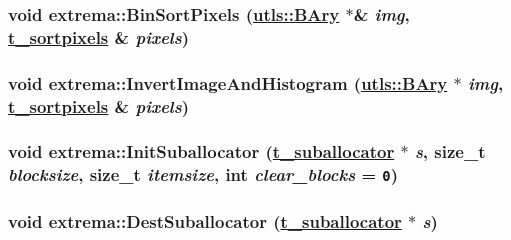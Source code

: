 \hypertarget{namespaceextrema_85efee4f382151dffcde01fae9e024a2}{
\subsubsection[BinSortPixels]{\setlength{\rightskip}{0pt plus 5cm}void extrema::Bin\-Sort\-Pixels (\hyperlink{structutls_1_1Ary}{utls::BAry} $\ast$\& {\em img}, \hyperlink{namespaceextrema_fe82307c3b119c3da09a001341fa3560}{t\_\-sortpixels} \& {\em pixels})}}
\label{namespaceextrema_85efee4f382151dffcde01fae9e024a2}


\hypertarget{namespaceextrema_15d6b1b2157ca27ca1aa21c4508ee33f}{
\subsubsection[InvertImageAndHistogram]{\setlength{\rightskip}{0pt plus 5cm}void extrema::Invert\-Image\-And\-Histogram (\hyperlink{structutls_1_1Ary}{utls::BAry} $\ast$ {\em img}, \hyperlink{namespaceextrema_fe82307c3b119c3da09a001341fa3560}{t\_\-sortpixels} \& {\em pixels})}}
\label{namespaceextrema_15d6b1b2157ca27ca1aa21c4508ee33f}


\hypertarget{namespaceextrema_0b971925373c3684db10539689b21879}{
\subsubsection[InitSuballocator]{\setlength{\rightskip}{0pt plus 5cm}void extrema::Init\-Suballocator (\hyperlink{namespaceextrema_6be19e858e73efb5002c6ee94bba43fb}{t\_\-suballocator} $\ast$ {\em s}, size\_\-t {\em blocksize}, size\_\-t {\em itemsize}, int {\em clear\_\-blocks} = {\tt 0})}}
\label{namespaceextrema_0b971925373c3684db10539689b21879}


\hypertarget{namespaceextrema_bf7e7f237cf6664202fe8dcccec27460}{
\subsubsection[DestSuballocator]{\setlength{\rightskip}{0pt plus 5cm}void extrema::Dest\-Suballocator (\hyperlink{namespaceextrema_6be19e858e73efb5002c6ee94bba43fb}{t\_\-suballocator} $\ast$ {\em s})}}
\label{namespaceextrema_bf7e7f237cf6664202fe8dcccec27460}


